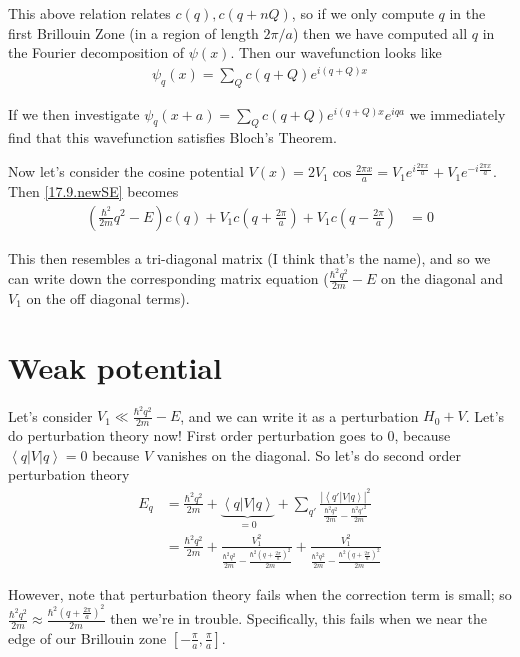 \documentclass[10pt]{report}
\newcommand{\bra}[1]{\left<#1\right|}
\newcommand{\ket}[1]{\left|#1\right>}
\newcommand{\abs}[1]{\left|#1\right|}
\begin{document}
This above relation relates $c(q), c(q+nQ)$, so if we only compute $q$ in the first Brillouin Zone (in a region of length $2\pi/a$) then we have computed all $q$ in the Fourier decomposition of $\psi(x)$. Then our wavefunction looks like
\begin{align}
    \psi_q(x) = \sum\limits_{Q}^{}c(q+Q)e^{i(q+Q)x}
\end{align}

If we then investigate $\psi_q(x+a) = \sum\limits_{Q}^{}c(q+Q)e^{i(q+Q)x}e^{iqa}$ we immediately find that this wavefunction satisfies Bloch's Theorem.

Now let's consider the cosine potential $V(x) = 2V_1\cos \frac{2\pi x}{a} = V_1e^{i\frac{2\pi x}{a}} + V_1e^{-i\frac{2\pi x}{a}}$. Then \eqref{17.9.newSE} becomes
\begin{align}
    \left(\frac{\hbar^2}{2m}q^2 - E\right)c(q) + V_1c\left( q + \frac{2\pi}{a} \right) + V_1c\left( q - \frac{2\pi}{a} \right) &= 0
\end{align}

This then resembles a tri-diagonal matrix (I think that's the name), and so we can write down the corresponding matrix equation ($\frac{\hbar^2 q^2}{2m} - E$ on the diagonal and $V_1$ on the off diagonal terms).

\section{Weak potential}

Let's consider $V_1 \ll \frac{\hbar^2 q^2}{2m} - E$, and we can write it as a perturbation $H_0 + V$. Let's do perturbation theory now! First order perturbation goes to $0$, because $\bra{q}V\ket{q} = 0$ because $V$ vanishes on the diagonal. So let's do second order perturbation theory
\begin{align}
    E_q &= \frac{\hbar^2 q^2}{2m} + \underbrace{\bra{q}V\ket{q}}_{=0} + \sum\limits_{q'}^{}\frac{\abs{\bra{q'}V\ket{q}}^2}{\frac{\hbar^2 q^2}{2m} - \frac{\hbar^2 q'^2}{2m}}\\
    &= \frac{\hbar^2 q^2}{2m} + \frac{V_1^2}{\frac{\hbar^2 q^2}{2m} - \frac{\hbar^2 \left(q + \frac{2\pi}{a}\right)^2}{2m} } + \frac{V_1^2}{\frac{\hbar^2 q^2}{2m} - \frac{\hbar^2 \left(q + \frac{2\pi}{a}\right)^2}{2m}}
\end{align}

However, note that perturbation theory fails when the correction term is small; so $\frac{\hbar^2 q^2}{2m} \approx \frac{\hbar^2 \left( q + \frac{2\pi}{a} \right)^2}{2m}$ then we're in trouble. Specifically, this fails when we near the edge of our Brillouin zone $\left[ -\frac{\pi}{a}, \frac{\pi}{a} \right]$. 
\end{document}
